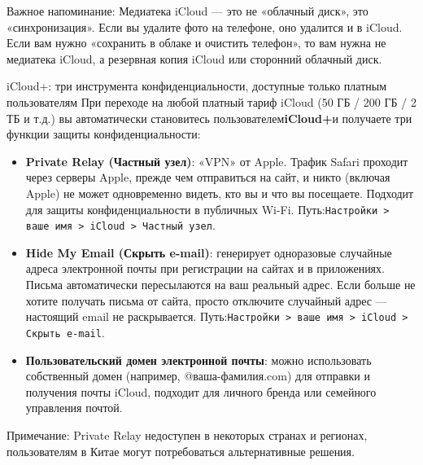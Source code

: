 Важное напоминание: Медиатека iCloud — это не «облачный диск», это «синхронизация». Если вы удалите фото на телефоне, оно удалится и в iCloud. Если вам нужно «сохранить в облаке и очистить телефон», то вам нужна не медиатека iCloud, а резервная копия iCloud или сторонний облачный диск.

\begin{tcbinfo}{iCloud+: три инструмента конфиденциальности, доступные только платным пользователям}
При переходе на любой платный тариф iCloud (50 ГБ / 200 ГБ / 2 ТБ и т.д.) вы автоматически становитесь пользователем\textbf{iCloud+}и получаете три функции защиты конфиденциальности:

\begin{itemize}
  \item \textbf{Private Relay (Частный узел)}: «VPN» от Apple. Трафик Safari проходит через серверы Apple, прежде чем отправиться на сайт, и никто (включая Apple) не может одновременно видеть, кто вы и что вы посещаете. Подходит для защиты конфиденциальности в публичных Wi-Fi. Путь:\texttt{Настройки > ваше имя > iCloud > Частный узел}.
  \item \textbf{Hide My Email (Скрыть e-mail)}: генерирует одноразовые случайные адреса электронной почты при регистрации на сайтах и в приложениях. Письма автоматически пересылаются на ваш реальный адрес. Если больше не хотите получать письма от сайта, просто отключите случайный адрес — настоящий email не раскрывается. Путь:\texttt{Настройки > ваше имя > iCloud > Скрыть e-\allowbreak mail}.
  \item \textbf{Пользовательский домен электронной почты}: можно использовать собственный домен (например, @ваша-фамилия.com) для отправки и получения почты iCloud, подходит для личного бренда или семейного управления почтой.
\end{itemize}

Примечание: Private Relay недоступен в некоторых странах и регионах, пользователям в Китае могут потребоваться альтернативные решения.

\end{tcbinfo}


